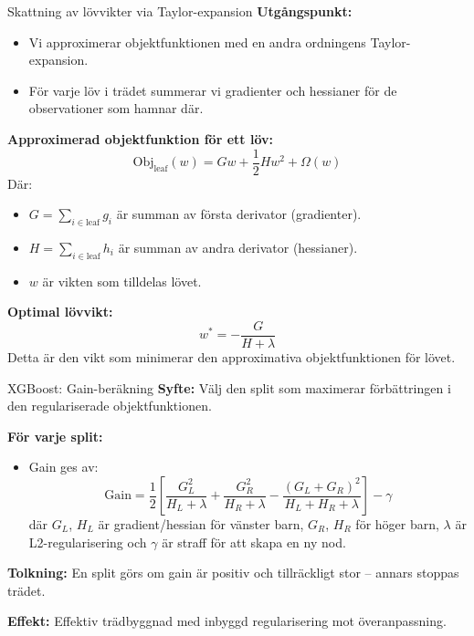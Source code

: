 \documentclass[10pt,english]{beamer}
\begin{document}
\begin{frame}{Skattning av lövvikter via Taylor-expansion}
  \textbf{Utgångspunkt:}
  \begin{itemize}
    \item Vi approximerar objektfunktionen med en andra ordningens Taylor-expansion.
    \item För varje löv i trädet summerar vi gradienter och hessianer för de observationer som hamnar där.
  \end{itemize}

  \textbf{Approximerad objektfunktion för ett löv:}
  \begin{equation*}
    \text{Obj}_{\text{leaf}}(w) = G w + \frac{1}{2} H w^2 + \Omega(w)
  \end{equation*}
  Där:
  \begin{itemize}
    \item \( G = \sum_{i \in \text{leaf}} g_i \) är summan av första derivator (gradienter).
    \item \( H = \sum_{i \in \text{leaf}} h_i \) är summan av andra derivator (hessianer).
    \item \( w \) är vikten som tilldelas lövet.
  \end{itemize}

  \textbf{Optimal lövvikt:}
  \begin{equation*}
    w^* = -\frac{G}{H + \lambda}
  \end{equation*}
  Detta är den vikt som minimerar den approximativa objektfunktionen för lövet.
\end{frame}



\begin{frame}{XGBoost: Gain-beräkning}
  \textbf{Syfte:} Välj den split som maximerar förbättringen i den regulariserade objektfunktionen.

  \textbf{För varje split:}
  \begin{itemize}
    \item Gain ges av:
    \[
      \text{Gain} = \frac{1}{2} \left[ \frac{G_L^2}{H_L + \lambda} + \frac{G_R^2}{H_R + \lambda} - \frac{(G_L + G_R)^2}{H_L + H_R + \lambda} \right] - \gamma
    \]
    där $G_L$, $H_L$ är gradient/hessian för vänster barn, $G_R$, $H_R$ för höger barn, $\lambda$ är L2-regularisering och $\gamma$ är straff för att skapa en ny nod.
  \end{itemize}

  \textbf{Tolkning:} En split görs om gain är positiv och tillräckligt stor – annars stoppas trädet.

  \textbf{Effekt:} Effektiv trädbyggnad med inbyggd regularisering mot överanpassning.
\end{frame}
\end{document}
